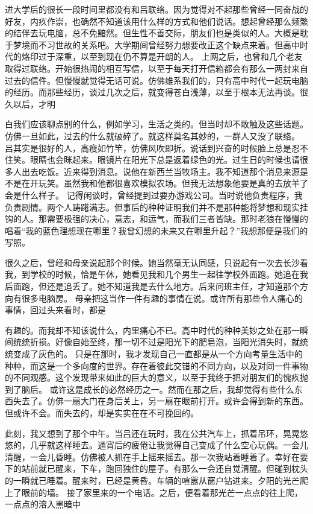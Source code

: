 \documentclass{article}
\begin{document}
进大学后的很长一段时间里都没有和吕联络。因为觉得对不起那些曾经一同奋战的好友，内疚作崇，也确然不知道该用什么样的方式和他们说话。想起曾经那么频繁的结伴去玩电脑，总不免黯然。但生性不善交际，朋友们也是类似的人。大概是耽于梦境而不习世故的关系吧。大学期间曾经努力想要改正这个缺点来着。但高中时代的烙印过于深重，以至到现在仍不算是开朗的人。 
上网之后，也曾和几个老友取得过联络。开始很热闹的相互写信，以至于每天打开信箱都会有那么一两封来自过去的信件。但慢慢就觉得无话可说。仿佛维系我们的，只有高中时代一起玩电脑的经历。而那些经历，谈过几次之后，就变得苍白浅薄，以至于根本无法再谈。很久以后，才明

\newpage 

白我们应该聊点别的什么，例如学习，生活之类的。但当时却不敢触及这些话题。仿佛一旦如此，过去的什么就破碎了。就这样莫名其妙的，一群人又没了联络。 
吕其实是很好的人，高瘦如竹竿，仿佛风吹即折。说话到兴奋的时候脸上总是忍不住笑。眼睛也会眯起来。眼镜片在阳光下总是返着绿色的光。过生日的时候也请很多人出去吃饭。近来得到消息。说他在新西兰当牧场主。我不知道那个消息来源是不是在开玩笑。虽然我和他都很喜欢模拟农场。但我无法想象他要是真的去放羊了会是什么样子。 
记得闲谈时，曾经提到过要办游戏公司。当时说他负责程序，我负责剧情。两个人踌躇满志。但事后的种种证明我们并不是那种能将梦想和现实挂钩的人。那需要极强的决心，意志，和运气，而我们三者皆缺。那时老狼在慢慢的唱着“我的蓝色理想现在哪里？我曾幻想的未来又在哪里升起？”我想那便是我们的写照。 

很久之后，曾经和母亲说起那个时候。她当然毫无认同感，只说起有一次去长沙看我，到学校的时候，恰是午休，她看见我和几个男生一起往学校外面跑。她追在我后面跑，但还是追丢了。她不知道我是去什么地方。后来问班主任，才知道那个方向有很多电脑房。 
母亲把这当作一件有趣的事情在说。或许所有那些令人痛心的事情，回过头来看时，都是

\newpage 

有趣的。而我却不知该说什么，内里痛心不已。高中时代的种种美妙之处在那一瞬间统统折损。好像自始至终，那一切不过是阳光下的肥皂泡，当阳光消失时，就统统变成了灰色的。 
只是在那时，我才发现自己一直都是从一个方向考量生活中的种种，而这是一个多向度的世界。存在着彼此交错的不同方向，以及对同一件事物的不同观感。这个发现带来如此的巨大的意义，以至于我终于把对朋友们的愧疚抛到了脑后。 
或许这是成长的必然经历之一。然而在那之后，我却觉得有些什么东西失去了。仿佛一扇大门在身后关上，另一扇在眼前打开。或许会得到新的东西。但或许不会。而失去的，却是实实在在不可挽回的。 

此刻，我又想到了那个中午。当吕还在玩时，我在公共汽车上，抓着吊环，晃晃悠悠的，几乎就这样睡去。通宵后的疲倦让我觉得自己变成了什么空心玩偶。一会儿清醒，一会儿昏睡。仿佛被人抓在手上摇来摇去。那一次我站着睡着了。幸好在要下的站前就已醒来，下车，跑回独住的屋子。有那么一会还自觉清醒。但碰到枕头的一瞬就已睡着。醒来时，已经是黄昏。车辆的喧嚣从窗户钻进来。夕阳的光芒爬上了眼前的墙。 
接了家里来的一个电话。之后，便看着那光芒一点点的往上爬，一点点的溶入黑暗中
\end{document}
